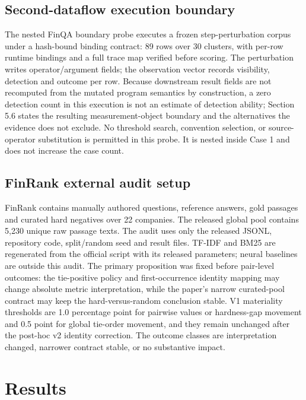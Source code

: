 \documentclass[10pt,conference]{IEEEtran}
\begin{document}
\subsection{Second-dataflow execution boundary}
The nested FinQA boundary probe executes a frozen step-perturbation corpus under a hash-bound binding contract: 89 rows over 30 clusters, with per-row runtime bindings and a full trace map verified before scoring. The perturbation writes operator/argument fields; the observation vector records visibility, detection and outcome per row. Because downstream result fields are not recomputed from the mutated program semantics by construction, a zero detection count in this execution is not an estimate of detection ability; Section 5.6 states the resulting measurement-object boundary and the alternatives the evidence does not exclude. No threshold search, convention selection, or source-operator substitution is permitted in this probe. It is nested inside Case 1 and does not increase the case count.
\subsection{FinRank external audit setup}
FinRank contains manually authored questions, reference answers, gold passages and curated hard negatives over 22 companies. The released global pool contains 5,230 unique raw passage texts. The audit uses only the released JSONL, repository code, split/random seed and result files. TF-IDF and BM25 are regenerated from the official script with its released parameters; neural baselines are outside this audit.
The primary proposition was fixed before pair-level outcomes: the tie-positive policy and first-occurrence identity mapping may change absolute metric interpretation, while the paper's narrow curated-pool contract may keep the hard-versus-random conclusion stable. V1 materiality thresholds are 1.0 percentage point for pairwise values or hardness-gap movement and 0.5 point for global tie-order movement, and they remain unchanged after the post-hoc v2 identity correction. The outcome classes are interpretation changed, narrower contract stable, or no substantive impact.
\section{Results}
\end{document}
